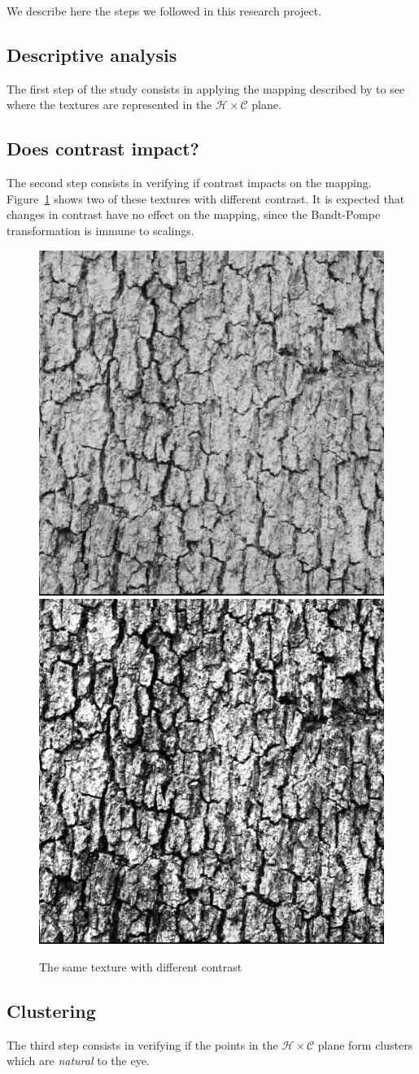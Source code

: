 \documentclass[12pt]{article}
\begin{document}
{\tiny }We describe here the steps we followed in this research project.

\subsection{Descriptive analysis}

The first step of the study consists in applying the mapping described by \citet{HistoryofArtPaintingsthroughtheLensofEntropyandComplexity2018} to see where the textures are represented in the $\mathcal H\times \mathcal C$ plane.

\subsection{Does contrast impact?}

The second step consists in verifying if contrast impacts on the mapping.
Figure~\ref{fig:TwoTexturesDifferentContrast} shows two of these textures with different contrast.
It is expected that changes in contrast have no effect on the mapping, since the Bandt-Pompe transformation is immune to scalings.

\begin{figure}[hbt]
\centering
\includegraphics[width=.23\linewidth]{1102png}
\includegraphics[width=.23\linewidth]{1202png}
\caption{The same texture with different contrast}\label{fig:TwoTexturesDifferentContrast}
\end{figure}

\subsection{Clustering}

The third step consists in verifying if the points in the $\mathcal H\times \mathcal C$ plane form clusters which are \textit{natural} to the eye.
\end{document}
